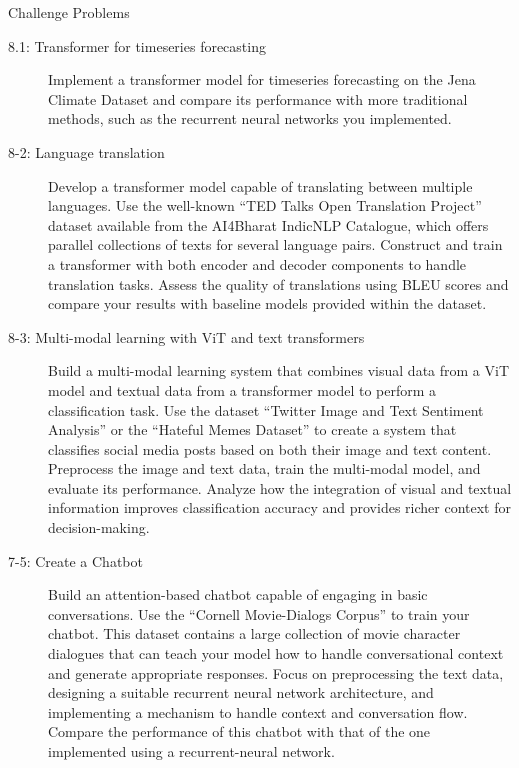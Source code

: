 \begin{nspbox}{Challenge Problems}
\begin{description}
    \item[8.1: Transformer for timeseries forecasting] 
    Implement a transformer model for timeseries forecasting on the Jena Climate Dataset and compare its performance with more traditional methods, such as the recurrent neural networks you implemented.
    
    \item [8-2: Language translation]
    Develop a transformer model capable of translating between multiple languages. Use the well-known ``TED Talks Open Translation Project'' dataset available from the AI4Bharat IndicNLP Catalogue, which offers parallel collections of texts for several language pairs.
    Construct and train a transformer with both encoder and decoder components to handle translation tasks.  Assess the quality of translations using BLEU scores and compare your results with baseline models provided within the dataset.

    \item [8-3: Multi-modal learning with ViT and text transformers]
    Build a multi-modal learning system that combines visual data from a ViT model and textual data from a transformer model to perform a classification task. Use the dataset ``Twitter Image and Text Sentiment Analysis'' or the ``Hateful Memes Dataset'' to create a system that classifies social media posts based on both their image and text content. Preprocess the image and text data, train the multi-modal model, and evaluate its performance. Analyze how the integration of visual and textual information improves classification accuracy and provides richer context for decision-making.

    \item [7-5: Create a Chatbot]
    Build an attention-based chatbot capable of engaging in basic conversations. Use the ``Cornell Movie-Dialogs Corpus'' to train your chatbot. This dataset contains a large collection of movie character dialogues that can teach your model how to handle conversational context and generate appropriate responses. Focus on preprocessing the text data, designing a suitable recurrent neural network architecture, and implementing a mechanism to handle context and conversation flow. Compare the performance of this chatbot with that of the one implemented using a recurrent-neural network.
\end{description}    
\end{nspbox}